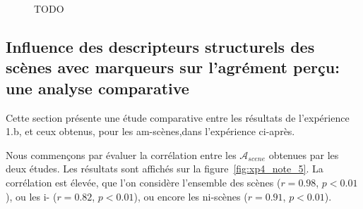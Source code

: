 \begin{figure}[t]
        \myfloatalign
       \caption[TODO]{TODO}\label{fig:xp4_note_245}
\end{figure}


\subsection{Influence des descripteurs structurels des scènes avec marqueurs sur l'agrément perçu: une analyse comparative}

Cette section présente une étude comparative entre les résultats de l'expérience 1.b, et ceux obtenus, pour les am-scènes,dans l'expérience ci-après. 

Nous commençons par évaluer la corrélation entre les $\mathcal{A}_{scene}$ obtenues par les deux études. Les résultats sont affichés sur la figure~\ref{fig:xp4_note_5}. La corrélation est élevée, que l'on considère l'ensemble des scènes ($r=0.98$, $p<0.01$), ou les i- ($r=0.82$, $p<0.01$), ou encore les ni-scènes  ($r=0.91$, $p<0.01$).

